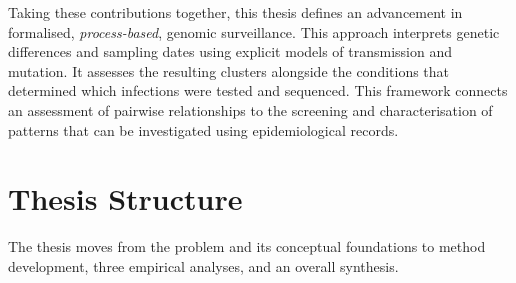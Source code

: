 Taking these contributions together, this thesis defines an advancement in formalised, \emph{process-based}, genomic surveillance. This approach interprets genetic differences and sampling dates using explicit models of transmission and mutation. It assesses the resulting clusters alongside the conditions that determined which infections were tested and sequenced. This framework connects an assessment of pairwise relationships to the screening and characterisation of patterns that can be investigated using epidemiological records.

\section{Thesis Structure}\label{sec:ch1_structure}

The thesis moves from the problem and its conceptual foundations to method development, three empirical analyses, and an overall synthesis.

